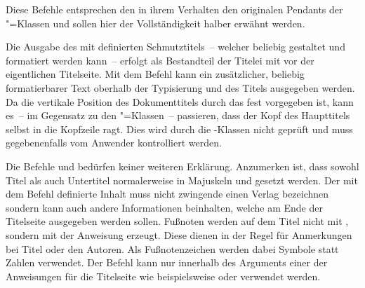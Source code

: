 \begin{Declaration}{}
\begin{Declaration}{}
\begin{Declaration}{}
\begin{Declaration}{}
\begin{Declaration}{}
\begin{Declaration}{}
\begin{Declaration}{}
\begin{Declaration}{}
\begin{Declaration}{}
\printdeclarationlist%
%
%
Diese Befehle entsprechen den in ihrem Verhalten den originalen Pendants der 
\KOMAScript"=Klassen{} und sollen hier der Vollständigkeit halber erwähnt 
werden.

Die Ausgabe des mit  definierten Schmutztitels~-- welcher 
beliebig gestaltet und formatiert werden kann~-- erfolgt als Bestandteil der 
Titelei mit  vor der eigentlichen Titelseite. Mit dem Befehl 
 kann ein zusätzlicher, beliebig formatierbarer Text oberhalb 
der Typisierung und des Titels ausgegeben werden. Da die vertikale Position des 
Dokumenttitels durch das \CD fest vorgegeben ist, kann es~-- im Gegensatz zu 
den \KOMAScript"=Klassen~-- passieren, dass der Kopf des Haupttitels selbst in 
die Kopfzeile ragt. Dies wird durch die \TUDScript-Klassen nicht geprüft und 
muss gegebenenfalls vom Anwender kontrolliert werden.

Die Befehle  und  bedürfen keiner weiteren 
Erklärung. Anzumerken ist, dass sowohl Titel als auch Untertitel normalerweise 
in Majuskeln und \DIN gesetzt werden. Der mit dem Befehl  
definierte Inhalt muss nicht zwingende einen Verlag bezeichnen sondern kann 
auch andere Informationen beinhalten, welche am Ende der Titelseite ausgegeben 
werden sollen.
%
Fußnoten werden auf dem Titel nicht mit , sondern mit der 
Anweisung  erzeugt. Diese dienen in der Regel für Anmerkungen bei 
Titel oder den Autoren. Als Fußnotenzeichen werden dabei Symbole statt Zahlen 
verwendet. Der Befehl  kann nur innerhalb des Arguments einer 
der Anweisungen für die Titelseite wie beispielsweise  oder 
 verwendet werden.


\end{Declaration}
\end{Declaration}
\end{Declaration}
\end{Declaration}
\end{Declaration}
\end{Declaration}
\end{Declaration}
\end{Declaration}
\end{Declaration}

